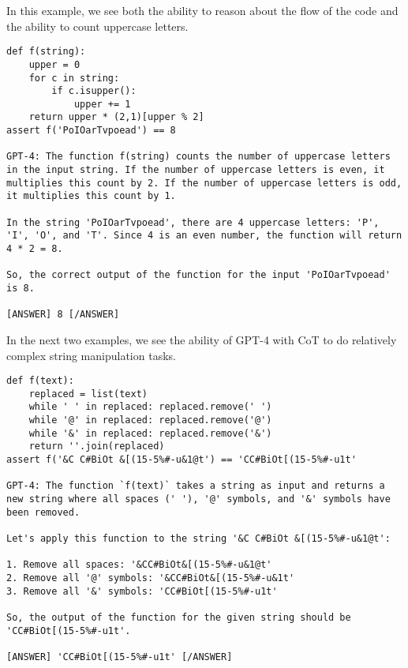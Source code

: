 In this example, we see both the ability to reason about the flow of the code and the ability to count uppercase letters.
\begin{lstlisting}
def f(string):
    upper = 0
    for c in string:
        if c.isupper():
            upper += 1
    return upper * (2,1)[upper % 2]
assert f('PoIOarTvpoead') == 8

GPT-4: The function f(string) counts the number of uppercase letters in the input string. If the number of uppercase letters is even, it multiplies this count by 2. If the number of uppercase letters is odd, it multiplies this count by 1.

In the string 'PoIOarTvpoead', there are 4 uppercase letters: 'P', 'I', 'O', and 'T'. Since 4 is an even number, the function will return 4 * 2 = 8.

So, the correct output of the function for the input 'PoIOarTvpoead' is 8.

[ANSWER] 8 [/ANSWER]
\end{lstlisting}

In the next two examples, we see the ability of GPT-4 with CoT to do relatively complex string manipulation tasks.
\begin{lstlisting}
def f(text):
    replaced = list(text)
    while ' ' in replaced: replaced.remove(' ')
    while '@' in replaced: replaced.remove('@')
    while '&' in replaced: replaced.remove('&')
    return ''.join(replaced)
assert f('&C C#BiOt &[(15-5%#-u&1@t') == 'CC#BiOt[(15-5%#-u1t'

GPT-4: The function `f(text)` takes a string as input and returns a new string where all spaces (' '), '@' symbols, and '&' symbols have been removed. 

Let's apply this function to the string '&C C#BiOt &[(15-5%#-u&1@t':

1. Remove all spaces: '&CC#BiOt&[(15-5%#-u&1@t'
2. Remove all '@' symbols: '&CC#BiOt&[(15-5%#-u&1t'
3. Remove all '&' symbols: 'CC#BiOt[(15-5%#-u1t'

So, the output of the function for the given string should be 'CC#BiOt[(15-5%#-u1t'.

[ANSWER] 'CC#BiOt[(15-5%#-u1t' [/ANSWER]
\end{lstlisting}

